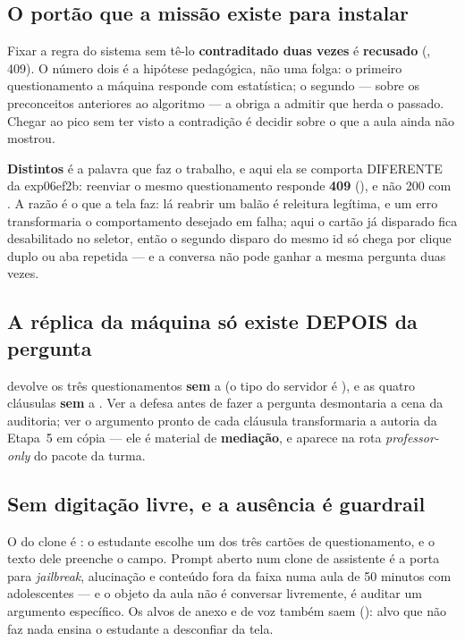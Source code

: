 \subsection{O portão que a missão existe para instalar}

Fixar a regra do sistema sem tê-lo \textbf{contraditado duas vezes} é
\textbf{recusado} (, 409). O número dois é a
hipótese pedagógica, não uma folga: o primeiro questionamento a máquina responde
com estatística; o segundo --- sobre os preconceitos anteriores ao algoritmo ---
a obriga a admitir que herda o passado. Chegar ao pico sem ter visto a
contradição é decidir sobre o que a aula ainda não mostrou.

\textbf{Distintos} é a palavra que faz o trabalho, e aqui ela se comporta
DIFERENTE da exp06ef2b: reenviar o mesmo questionamento responde \textbf{409}
(), e não 200 com . A razão é o que a tela
faz: lá reabrir um balão é releitura legítima, e um erro transformaria o
comportamento desejado em falha; aqui o cartão já disparado fica desabilitado no
seletor, então o segundo disparo do mesmo id só chega por clique duplo ou aba
repetida --- e a conversa não pode ganhar a mesma pergunta duas vezes.

\subsection{A réplica da máquina só existe DEPOIS da pergunta}

 devolve os três questionamentos \textbf{sem} a
 (o tipo do servidor é ),
e as quatro cláusulas \textbf{sem} a . Ver a defesa
antes de fazer a pergunta desmontaria a cena da auditoria; ver o argumento
pronto de cada cláusula transformaria a autoria da Etapa~5 em cópia --- ele é
material de \textbf{mediação}, e aparece na rota \emph{professor-only} do pacote
da turma.

\subsection{Sem digitação livre, e a ausência é guardrail}

O  do clone é : o estudante escolhe um dos três
cartões de questionamento, e o texto dele preenche o campo. Prompt aberto num
clone de assistente é a porta para \emph{jailbreak}, alucinação e conteúdo fora
da faixa numa aula de 50 minutos com adolescentes --- e o objeto da aula não é
conversar livremente, é auditar um argumento específico. Os alvos de anexo e de
voz também saem (): alvo que não faz nada ensina o
estudante a desconfiar da tela.

